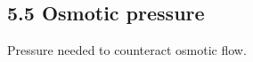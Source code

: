 \subsection{5.5 Osmotic pressure}
    Pressure needed to counteract osmotic flow.
    \vspace*{-0.2em}
    \vspace*{-0.5em}

